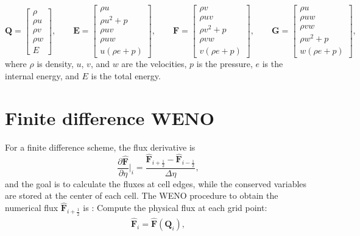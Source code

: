 \[ \begin{equation*} \mathbf{Q}= \begin{bmatrix} \rho \\ \rho u \\ \rho v \\ \rho w \\ E \end{bmatrix}, \qquad \mathbf{E}= \begin{bmatrix} \rho u \\ \rho u^2+p \\ \rho uv \\ \rho uw \\ u(\rho e+p) \end{bmatrix}, \qquad \mathbf{F}= \begin{bmatrix} \rho v \\ \rho uv \\ \rho v^2+p \\ \rho vw \\ v(\rho e+p) \end{bmatrix}, \qquad \mathbf{G}= \begin{bmatrix} \rho u \\ \rho uw \\ \rho vw \\ \rho w^2+p \\ w(\rho e+p) \end{bmatrix}, \end{equation*} \] where $\rho$ is density, $u$, $v$, and $w$ are the velocities, $p$ is the pressure, $e$ is the internal energy, and $E$ is the total energy.\hypertarget{weno_numerics}{}\section{Finite difference W\+E\+NO}\label{weno_numerics}
For a finite difference scheme, the flux derivative is \[ \begin{equation*} \frac{\partial \hat{\mathbf{F}}}{\partial \eta}\bigg\rvert_{i}=\frac{ \hat{\mathbf{F}}_{i+\frac{1}{2}}-\hat{\mathbf{F}}_{i-\frac{1}{2}}}{\Delta \eta}, \end{equation*} \] and the goal is to calculate the fluxes at cell edges, while the conserved variables are stored at the center of each cell. The W\+E\+NO procedure to obtain the numerical flux $\hat{\mathbf{F}}_{i+\frac{1}{2}}$ is \cite{Jiang1996:fifth} \cite{Jiang1999:mhd} \cite{Christlieb2014:mhd} \+:  Compute the physical flux at each grid point\+: \[ \begin{align*} \hat{\mathbf{F}}_{i} = \hat{\mathbf{F}}(\mathbf{Q}_{i}), \end{align*} \]

